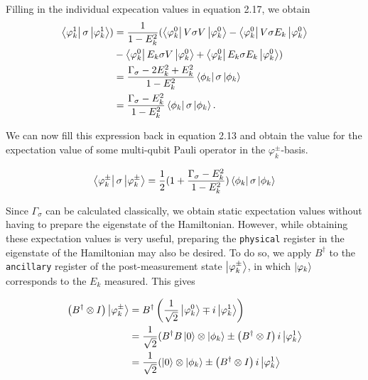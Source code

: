 Filling in the individual expecation values in equation 2.17, we obtain
\begin{align} \begin{split}
  \left\langle{\varphi_k^1}\right\vert \sigma \left\vert{\varphi_k^1}\right\rangle) &= \frac{1}{1-E_k^2} (\left\langle{\varphi_k^0}\right\vert V \sigma V \left\vert{\varphi_k^0}\right\rangle - \left\langle{\varphi_k^0}\right\vert V\sigma E_k \left\vert{\varphi_k^0}\right\rangle\\
  &- \left\langle{\varphi_k^0}\right\vert E_k \sigma V \left\vert{\varphi_k^0}\right\rangle + \left\langle{\varphi_k^0}\right\vert E_k \sigma E_k \left\vert{\varphi_k^0}\right\rangle)\\
  &= \frac{\Gamma_{\sigma} - 2 E_k^2 + E_k^2}{1-E_k^2} \left\langle{\phi_k}\right\vert \sigma \left\vert{\phi_k}\right\rangle\\
  &=  \frac{\Gamma_{\sigma} - E_k^2}{1-E_k^2} \left\langle{\phi_k}\right\vert \sigma \left\vert{\phi_k}\right\rangle.
\end{split} \end{align}

We can now fill this expression back in equation 2.13 and obtain the value for the expectation value of some multi-qubit Pauli operator in the $\varphi^{\pm}_k$-basis.


$$
\left\langle{\varphi_k^{\pm}}\right\vert \sigma \left\vert{\varphi_k^{\pm}}\right\rangle = \frac{1}{2}(1+\frac{\Gamma_{\sigma} - E_k^2}{1-E_k^2})  \left\langle{\phi_k}\right\vert \sigma \left\vert{\phi_k}\right\rangle
$$

Since $\Gamma_{\sigma}$ can be calculated classically, we obtain static expectation values without having to prepare the eigenstate of the Hamiltonian. However, while obtaining these expectation values is very useful, preparing the \verb|physical| register in the eigenstate of the Hamiltonian may also be desired. To do so, we apply $B^{\dagger}$ to the \verb|ancillary| register of the post-measurement state $\left\vert{\varphi_k^{\pm}}\right\rangle$, in which $\left\vert{\varphi_k}\right\rangle$ corresponds to the $E_k$ measured. This gives

\begin{align} \begin{split} \label{sup}
\left( B^{\dagger} \otimes I \right) \left\vert{\varphi_k^{\pm}}\right\rangle &= B^{\dagger} \left(\frac{1}{\sqrt{2}}\left\vert{\varphi_k^0}\right\rangle \mp i \left\vert{\varphi_k^1}\right\rangle\right) \\
&= \frac{1}{\sqrt{2}}(B^{\dagger} B \left\vert{0}\right\rangle \otimes \left\vert{\phi_k}\right\rangle \pm \left( B^{\dagger} \otimes I \right) i \left\vert{\varphi_k^1}\right\rangle\\
&= \frac{1}{\sqrt{2}}(\left\vert{0}\right\rangle \otimes \left\vert{\phi_k}\right\rangle \pm \left( B^{\dagger} \otimes I \right) i \left\vert{\varphi_k^1}\right\rangle\\
\end{split} \end{align}

